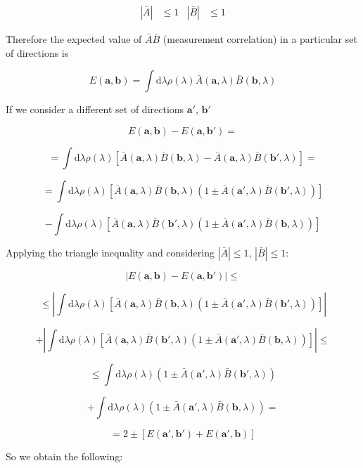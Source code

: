 \documentclass[11pt,dvipsnames]{article}
\begin{document}
$$
\begin{aligned}
|\bar{A}| &\leq 1 & |\bar{B}| &\leq 1
\end{aligned}
$$

Therefore the expected value of $\bar{A}\bar{B}$ (measurement correlation) in a particular set of directions is

$$
E(\mathbf{a}, \mathbf{b}) = 
\int\mathrm{d}\lambda\rho(\lambda)\bar{A}(\mathbf{a}, \lambda)\bar{B}(\mathbf{b}, \lambda)
$$

If we consider a different set of directions $\mathbf{a'}$, $\mathbf{b'}$

$$
E(\mathbf{a}, \mathbf{b}) - E(\mathbf{a}, \mathbf{b'}) =
$$

$$
= \int\mathrm{d}\lambda\rho(\lambda)
\left[\bar{A}(\mathbf{a}, \lambda)\bar{B}(\mathbf{b}, \lambda) - 
\bar{A}(\mathbf{a}, \lambda)\bar{B}(\mathbf{b'}, \lambda)\right] =
$$

$$
= \int\mathrm{d}\lambda\rho(\lambda)
\left[\bar{A}(\mathbf{a}, \lambda)\bar{B}(\mathbf{b}, \lambda)(1 \pm 
\bar{A}(\mathbf{a'}, \lambda)\bar{B}(\mathbf{b'}, \lambda))\right] 
$$

$$
- \int\mathrm{d}\lambda\rho(\lambda)
\left[\bar{A}(\mathbf{a}, \lambda)\bar{B}(\mathbf{b'}, \lambda)(1 \pm 
\bar{A}(\mathbf{a'}, \lambda)\bar{B}(\mathbf{b}, \lambda))\right] 
$$

Applying the triangle inequality and considering $|\bar{A}| \leq 1$, $ |\bar{B}| \leq 1$:

$$
|E(\mathbf{a}, \mathbf{b}) - E(\mathbf{a}, \mathbf{b'})|\leq
$$

$$
\leq \left|\int\mathrm{d}\lambda\rho(\lambda)
\left[\bar{A}(\mathbf{a}, \lambda)\bar{B}(\mathbf{b}, \lambda)(1 \pm 
\bar{A}(\mathbf{a'}, \lambda)\bar{B}(\mathbf{b'}, \lambda))\right]\right|
$$

$$
+ \left|\int\mathrm{d}\lambda\rho(\lambda)
\left[\bar{A}(\mathbf{a}, \lambda)\bar{B}(\mathbf{b'}, \lambda)(1 \pm 
\bar{A}(\mathbf{a'}, \lambda)\bar{B}(\mathbf{b}, \lambda))\right]\right| \leq 
$$

$$
\leq \int\mathrm{d}\lambda\rho(\lambda)
(1 \pm \bar{A}(\mathbf{a'}, \lambda)\bar{B}(\mathbf{b'}, \lambda))
$$

$$
+ \int\mathrm{d}\lambda\rho(\lambda)
(1 \pm \bar{A}(\mathbf{a'}, \lambda)\bar{B}(\mathbf{b}, \lambda)) =
$$

$$
= 2 \pm [E(\mathbf{a'}, \mathbf{b'}) + E(\mathbf{a'}, \mathbf{b})]
$$

So we obtain the following:
\end{document}
